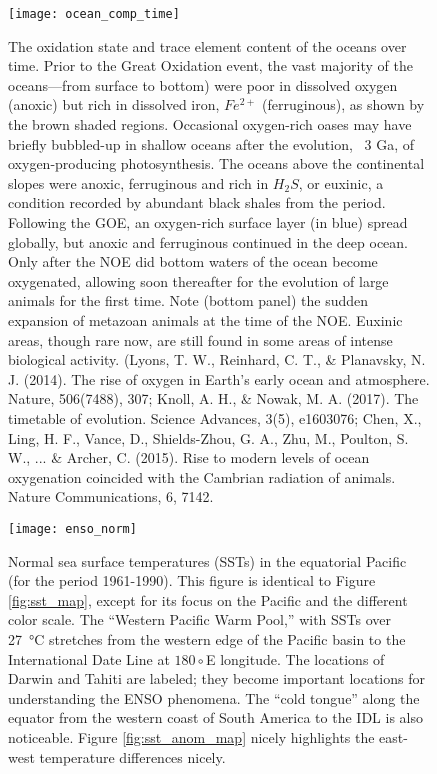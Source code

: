 \documentclass[amstex,12pt]{book}
\begin{document}
{\begin{figure}[ht]
\label{fig:historic_sst}
\end{figure}


\newpage
\begin{figure}[ht]
\centering
\texttt{[image: ocean\_comp\_time]}%
\caption{The oxidation state and trace element content of the oceans over time. Prior to the Great Oxidation event, the vast majority of the oceans---from surface to bottom) were poor in dissolved oxygen (anoxic) but rich in dissolved  iron, $Fe^{2+}$ (ferruginous), as shown by the brown shaded regions. Occasional oxygen-rich oases may have briefly bubbled-up in shallow oceans after the evolution, ~3 Ga, of oxygen-producing photosynthesis. The oceans above the continental slopes were anoxic, ferruginous and rich in $H_2S$, or euxinic, a condition recorded by abundant black shales from the period. Following the GOE, an oxygen-rich surface layer (in blue) spread globally, but anoxic and ferruginous continued in the deep ocean. Only after the NOE did bottom waters of the ocean become oxygenated, allowing soon thereafter for the evolution of large animals for the first time. Note (bottom panel) the sudden expansion of metazoan animals at the time of the NOE. Euxinic areas, though rare now, are still found in some areas of intense biological activity. (Lyons, T. W., Reinhard, C. T., \& Planavsky, N. J. (2014). The rise of oxygen in Earth’s early ocean and atmosphere. Nature, 506(7488), 307; Knoll, A. H., \& Nowak, M. A. (2017). The timetable of evolution. Science Advances, 3(5), e1603076; Chen, X., Ling, H. F., Vance, D., Shields-Zhou, G. A., Zhu, M., Poulton, S. W., ... \& Archer, C. (2015). Rise to modern levels of ocean oxygenation coincided with the Cambrian radiation of animals. Nature Communications, 6, 7142.}   
\label{fig:ocean_comp}
\end{figure} 

\newpage
\begin{figure}[ht]
\centering
\texttt{[image: enso\_norm]}%
\caption{Normal sea surface temperatures (SSTs) in the equatorial Pacific (for the period 1961-1990). This figure is identical to Figure \ref{fig:sst_map}, except for its focus on the Pacific and the different color scale. The ``Western Pacific Warm Pool,'' with SSTs over \SI{27}{\celsius} stretches from the western edge of the Pacific basin to the International Date Line at $180\circ$E longitude. The locations of Darwin and Tahiti are labeled; they become important locations for understanding the ENSO phenomena. The ``cold tongue'' along the equator from the western coast of South America to the IDL is also noticeable. Figure \ref{fig:sst_anom_map} nicely highlights the east-west temperature differences nicely.} 
\label{fig:enso_norm}
\end{figure} 

}
\end{document}
